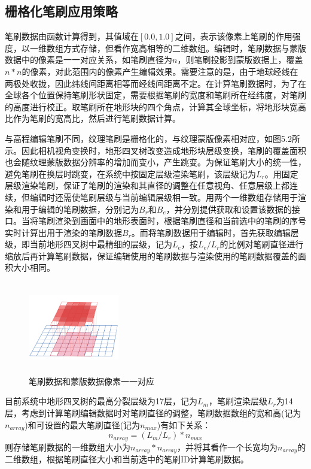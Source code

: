 \subsection{栅格化笔刷应用策略}
笔刷数据由函数计算得到，其值域在$[0.0,1.0]$之间，表示该像素上笔刷的作用强度，以一维数组方式存储，但看作宽高相等的二维数组。编辑时，笔刷数据与蒙版数据中的像素是一一对应关系，如笔刷直径为$n$，则笔刷投影到蒙版数据上，覆盖$n*n$的像素，对此范围内的像素产生编辑效果。需要注意的是，由于地球经线在两极处收拢，因此纬线间距离相等而经线间距离不定。在计算笔刷数据时，为了在全球各个位置保持笔刷形状固定，需要根据笔刷的宽度和笔刷所在经纬度，对笔刷的高度进行校正。取笔刷所在地形块的四个角点，计算其全球坐标，将地形块宽高比作为笔刷的宽高比，然后进行笔刷数据计算。\par

与高程编辑笔刷不同，纹理笔刷是栅格化的，与纹理蒙版像素相对应，如图5.2所示。因此相机视角变换时，地形四叉树改变造成地形块层级变换，笔刷的覆盖面积也会随纹理蒙版数据分辨率的增加而变小，产生跳变。为保证笔刷大小的统一性，避免笔刷在换层时跳变，在系统中按固定层级渲染笔刷，该层级记为$L_r$。用固定层级渲染笔刷，保证了笔刷的渲染和其直径的调整在任意视角、任意层级上都连续，但编辑时还需使笔刷层级与当前编辑层级相一致。用两个一维数组存储用于渲染和用于编辑的笔刷数据，分别记为$B_r$和$B_e$，并分别提供获取和设置该数据的接口。当将笔刷渲染到画面中的地形表面时，根据笔刷直径和当前选中的笔刷的序号实时计算出用于渲染的笔刷数据$B_r$。而将笔刷数据用于编辑时，首先获取编辑层级，即当前地形四叉树中最精细的层级，记为$L_e$，按$L_e/L_r$的比例对笔刷直径进行缩放后再计算笔刷数据，保证编辑使用的笔刷数据与渲染使用的笔刷数据覆盖的面积大小相同。\par
\begin{figure}[htb]
    \centering
    \includegraphics[height=4cm ,width=4cm]{figures/brush2.png}
  \caption{笔刷数据和蒙版数据像素一一对应}
  \end{figure}
目前系统中地形四叉树的最高分裂层级为17层，记为$L_m$，笔刷渲染层级$L_r$为14层，考虑到计算笔刷编辑数据时对笔刷直径的调整，笔刷数据数组的宽和高(记为$n_{array}$)和可设置的最大笔刷直径(记为$n_{max}$)有如下关系：
\begin{equation}
n_{array}=(L_m/L_r)*n_{max}
\end{equation}
则存储笔刷数据的一维数组大小为$n_{array}*n_{array}$，并将其看作一个长宽均为$n_{array}$的二维数组，根据笔刷直径大小和当前选中的笔刷ID计算笔刷数据。\par
